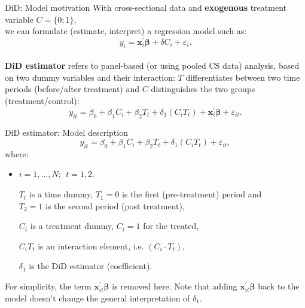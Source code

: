 \documentclass{beamer}
\begin{document}
\begin{frame}{DiD: Model motivation}
\small
With cross-sectional data and \textbf{exogenous}  treatment variable $C = \{0;1\}$, \\we can formulate (estimate, interpret) a regression model such as:
$$
y_i = \bm{x}_i^{\prime}\bm{\beta} + \delta C_i + \varepsilon_i.
$$\\
\medskip
\textbf{DiD estimator} refers to panel-based (or using pooled CS data) analysis, based on two dummy variables and their interaction: $T$ differentiates between two time periods (before/after treatment) and $C$ distinguishes the two groups (treatment/control):
$$y_{it}=\beta_0 + \beta_1 C_i + \beta_2 T_t + \delta_1 (C_i T_t) + \bm{x}_i^{\prime}\bm{\beta} + \varepsilon_{it}.$$

\end{frame}
\begin{frame}{DiD estimator: Model description} 
\medskip 
$$y_{it}=\beta_0 + \beta_1 C_i + \beta_2 T_t + \delta_1 (C_i T_t) + \varepsilon_{it},$$
where:
\begin{itemize}
\item $i=1, \dots, N;~~t=1,2$. \\
\item[$T_t$] is a time dummy, $T_1=0$ is the first (pre-treatment) period and \\$T_2 = 1$ is the second period (post treatment),
\item[$C_i$] is a treatment dummy, $C_i=1$ for the treated,
\item[$C_i T_t$] is an interaction element, i.e. $(C_i\! \cdot \! T_t)$,
\item[$\delta_1$] is the DiD estimator (coefficient). 
\end{itemize}
\bigskip
For simplicity, the term $\bm{x}_{it}^{\prime}\bm{\beta}$ is removed here. Note that adding $\bm{x}_{it}^{\prime}\bm{\beta}$ back to the model doesn't change the general interpretation of $\delta_1$.
\end{frame}
\end{document}
